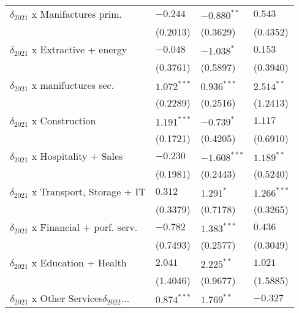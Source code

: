 \begin{tabular}{llll}
$\delta_{2021}$ x Manifactures prim.               &           $-0.244$ &      $-0.880^{**}$ &            $0.543$ \\
                                                   &           (0.2013) &           (0.3629) &           (0.4352) \\
$\delta_{2021}$ x Extractive + energy              &           $-0.048$ &         $-1.038^*$ &            $0.153$ \\
                                                   &           (0.3761) &           (0.5897) &           (0.3940) \\
$\delta_{2021}$ x manifuctures sec.                &      $1.072^{***}$ &      $0.936^{***}$ &       $2.514^{**}$ \\
                                                   &           (0.2289) &           (0.2516) &           (1.2413) \\
$\delta_{2021}$ x Construction                     &      $1.191^{***}$ &         $-0.739^*$ &            $1.117$ \\
                                                   &           (0.1721) &           (0.4205) &           (0.6910) \\
$\delta_{2021}$ x Hospitality + Sales              &           $-0.230$ &     $-1.608^{***}$ &       $1.189^{**}$ \\
                                                   &           (0.1981) &           (0.2443) &           (0.5240) \\
$\delta_{2021}$ x Transport, Storage + IT          &            $0.312$ &          $1.291^*$ &      $1.266^{***}$ \\
                                                   &           (0.3379) &           (0.7178) &           (0.3265) \\
$\delta_{2021}$ x Financial + porf. serv.          &           $-0.782$ &      $1.383^{***}$ &            $0.436$ \\
                                                   &           (0.7493) &           (0.2577) &           (0.3049) \\
$\delta_{2021}$ x Education + Health               &            $2.041$ &       $2.225^{**}$ &            $1.021$ \\
                                                   &           (1.4046) &           (0.9677) &           (1.5885) \\
$\delta_{2021}$ x Other Services$\delta_{2022}$... &      $0.874^{***}$ &       $1.769^{**}$ &           $-0.327$ \\

\end{tabular}

